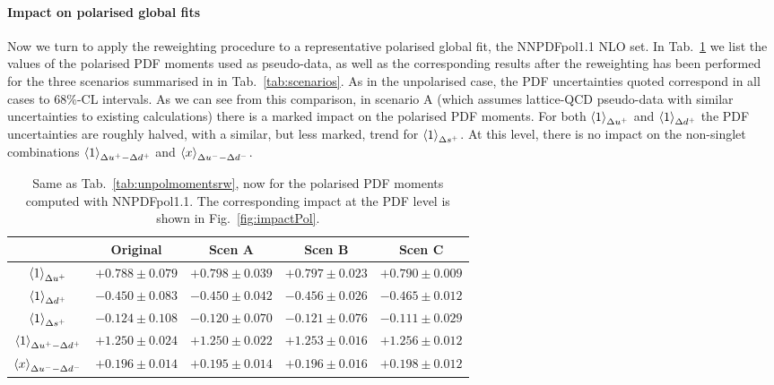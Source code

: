 \paragraph{Impact on polarised global fits}
%
Now we turn to apply the
reweighting procedure to a representative polarised
global fit, the NNPDFpol1.1 NLO set.
%
In Tab.~\ref{tab:polmomentsrw}
we list the values of the polarised PDF moments
  used as pseudo-data, as well as the corresponding results
  after the reweighting has been performed for the
three scenarios summarised in 
in Tab.~\ref{tab:scenarios}.
%
As in the unpolarised case, the PDF uncertainties quoted correspond in all cases to 
68\%-CL intervals.
%
As we can see from this comparison, in scenario A
(which assumes lattice-QCD pseudo-data with similar uncertainties
to existing calculations) there is a marked impact on the
polarised PDF moments.
%
For both $\left\langle 1\right\rangle_{\Delta u^+}$ and $\left\langle 1\right\rangle_{\Delta d^+}$
the PDF uncertainties are roughly halved, with a similar, but less marked,
trend for $\left\langle 1\right\rangle_{\Delta s^+}$.
%
At this level, there is no impact on the non-singlet
combinations $\left\langle 1\right\rangle_{\Delta u^+ - \Delta d^+}$
and $\left\langle x\right\rangle_{\Delta u^--\Delta d^-}$.

\begin{table}[t]
  \centering
  \renewcommand{\arraystretch}{1.4} 
\begin{tabular}{c||c||c|c|c}
  \hline &  Original  & Scen A  &  Scen B  & Scen C  \\
  \hline
  $\left\langle 1\right\rangle_{\Delta u^+}$    &  $+0.788\pm  0.079$   & $+0.798\pm  0.039$     &
  $+0.797\pm  0.023$ &   $+0.790\pm  0.009$ \\
  $\left\langle 1\right\rangle_{\Delta d^+}$   &  $-0.450 \pm 0.083$  &  $-0.450 \pm 0.042$  &
  $-0.456 \pm 0.026$    &  $-0.465 \pm 0.012$   \\
  $\left\langle 1\right\rangle_{\Delta s^+}$    &  $-0.124\pm   0.108 $  & $-0.120\pm   0.070 $  &
  $-0.121\pm   0.076 $    &   $-0.111\pm   0.029 $  \\
  $\left\langle 1\right\rangle_{\Delta u^+ - \Delta d^+}$  & $+1.250 \pm 0.024$   & $+1.250 \pm 0.022$  &
  $+1.253 \pm 0.016$ &    $+1.256 \pm 0.012$  \\
  $\left\langle x\right\rangle_{\Delta u^--\Delta d^-}$     & $+0.196 \pm 0.014$    & $+0.195 \pm 0.014$
  & $+0.196 \pm 0.016$     &  $+0.198 \pm 0.012$    \\
  \hline
\end{tabular}
\caption{\small Same as Tab.~\ref{tab:unpolmomentsrw}, now for
  the polarised PDF moments computed with NNPDFpol1.1.
  The corresponding impact at the PDF level is shown in
  Fig.~\ref{fig:impactPol}.
%
%
\label{tab:polmomentsrw}
}
\end{table}

